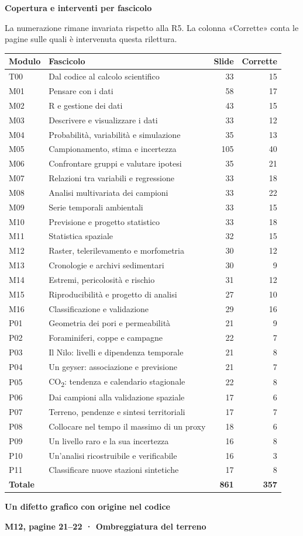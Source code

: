 \documentclass[11pt,a4paper]{article}
\newcommand{\titolo}[1]{{\color{Navy}\LARGE\bfseries #1\par}\vspace{4pt}{\color{Teal}\hrule height 1.4pt}\vspace{12pt}}
\begin{document}
\newpage
\titolo{Copertura e interventi per fascicolo}
La numerazione rimane invariata rispetto alla R5. La colonna «Corrette» conta le pagine sulle quali è intervenuta questa rilettura.
\small
\begin{longtable}{p{1.25cm}p{10.95cm}rr}
\toprule Modulo & Fascicolo & Slide & Corrette\\\midrule\endhead
T00 & Dal codice al calcolo scientifico & 33 & 15\\
M01 & Pensare con i dati & 58 & 17\\
M02 & R e gestione dei dati & 43 & 15\\
M03 & Descrivere e visualizzare i dati & 33 & 12\\
M04 & Probabilità, variabilità e simulazione & 35 & 13\\
M05 & Campionamento, stima e incertezza & 105 & 40\\
M06 & Confrontare gruppi e valutare ipotesi & 35 & 21\\
M07 & Relazioni tra variabili e regressione & 33 & 18\\
M08 & Analisi multivariata dei campioni & 33 & 22\\
M09 & Serie temporali ambientali & 33 & 15\\
M10 & Previsione e progetto statistico & 33 & 18\\
M11 & Statistica spaziale & 32 & 15\\
M12 & Raster, telerilevamento e morfometria & 30 & 12\\
M13 & Cronologie e archivi sedimentari & 30 & 9\\
M14 & Estremi, pericolosità e rischio & 31 & 12\\
M15 & Riproducibilità e progetto di analisi & 27 & 10\\
M16 & Classificazione e validazione & 29 & 16\\
P01 & Geometria dei pori e permeabilità & 21 & 9\\
P02 & Foraminiferi, coppe e campagne & 22 & 7\\
P03 & Il Nilo: livelli e dipendenza temporale & 21 & 8\\
P04 & Un geyser: associazione e previsione & 21 & 7\\
P05 & CO\textsubscript{2}: tendenza e calendario stagionale & 22 & 8\\
P06 & Dai campioni alla validazione spaziale & 17 & 6\\
P07 & Terreno, pendenze e sintesi territoriali & 17 & 7\\
P08 & Collocare nel tempo il massimo di un proxy & 18 & 6\\
P09 & Un livello raro e la sua incertezza & 16 & 8\\
P10 & Un’analisi ricostruibile e verificabile & 16 & 3\\
P11 & Classificare nuove stazioni sintetiche & 17 & 8\\
\midrule\textbf{Totale} & & \textbf{861} & \textbf{357}\\\bottomrule
\end{longtable}
\normalsize
\newpage
\titolo{Un difetto grafico con origine nel codice}
\textbf{M12, pagine 21–22 · Ombreggiatura del terreno}
\end{document}
